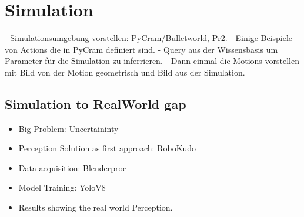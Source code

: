 \chapter*{Simulation}
- Simulationsumgebung vorstellen: PyCram/Bulletworld, Pr2. \newline
- Einige Beispiele von Actions die in PyCram definiert sind. \newline
- Query aus der Wissensbasis um Parameter für die Simulation zu inferrieren.\newline
- Dann einmal die Motions vorstellen mit Bild von der Motion geometrisch und Bild aus der Simulation. \newline
	
\section*{Simulation to RealWorld gap}
\begin{itemize}
	\item Big Problem: Uncertaininty
	\item Perception Solution as first approach: RoboKudo
	\item Data acquisition: Blenderproc
	\item Model Training: YoloV8
	\item Results showing the real world Perception.
\end{itemize}